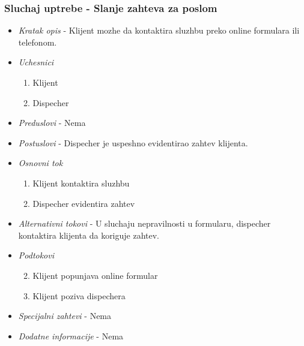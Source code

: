 \documentclass[10 pt]{article}
\begin{document}
	\subsubsection{Sluchaj uptrebe - Slanje zahteva za poslom}
		\begin{itemize}
			
			\item \textit{Kratak opis} - Klijent mozhe da kontaktira sluzhbu preko online formulara ili telefonom.
			
			\item \textit{Uchesnici}
				\begin{enumerate}
					\item Klijent
					\item Dispecher
				\end{enumerate}
			
			\item \textit{Preduslovi} - Nema
			
			\item \textit{Postuslovi} - Dispecher je uspeshno evidentirao zahtev klijenta.
			
			\item \textit{Osnovni tok}
				\begin{enumerate}
					\item Klijent kontaktira sluzhbu
					\item Dispecher evidentira zahtev
				\end{enumerate}
			
			\item \textit{Alternativni tokovi} - U sluchaju nepravilnosti u formularu, dispecher kontaktira klijenta da koriguje zahtev.
			
			\item \textit{Podtokovi} 
				\begin{enumerate}
					\begin{enumerate}
						\setcounter{enumi}{1}
						\item Klijent popunjava online formular
						\item Klijent poziva dispechera
					\end{enumerate}
				\end{enumerate}
			
			\item \textit{Specijalni zahtevi} - Nema
			
			\item \textit{Dodatne informacije} - Nema
			
		\end{itemize}
		
\end{document}
